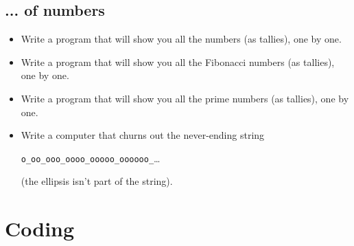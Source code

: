 \documentclass{article}
\newcommand*{\writeit}{\item[\NibRight]}
\newcommand{\str}[1]{\texttt{#1}}
\begin{document}
\subsection*{... of numbers}
\begin{itemize}
\writeit Write a program that will show you all the numbers (as tallies), one by one.
\writeit Write a program that will show you all the Fibonacci numbers (as tallies), one by one.
\writeit Write a program that will show you all the prime numbers (as tallies), one by one.
\writeit
Write a computer that churns out the never-ending string
\begin{center}
\str{o\_oo\_ooo\_oooo\_ooooo\_oooooo\_}\quad\ldots
\end{center}
(the ellipsis isn't part of the string).
\end{itemize}
\section*{Coding}
\end{document}
